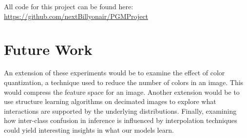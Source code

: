 \documentclass{article}
\begin{document}
All code for this project can be found here: \url{https://github.com/nextBillyonair/PGMProject}


\section{Future Work}
An extension of these experiments would be to examine the effect of color
quantization, a technique used to reduce the number of colors in an image. This
would compress the feature space for an image. Another extension would
be to use structure learning algorithms on decimated images to explore
what interactions are supported by the underlying distributions. Finally,
examining how inter-class confusion in inference is influenced by interpolation
techniques could yield interesting insights in what our models learn.









\end{document}
